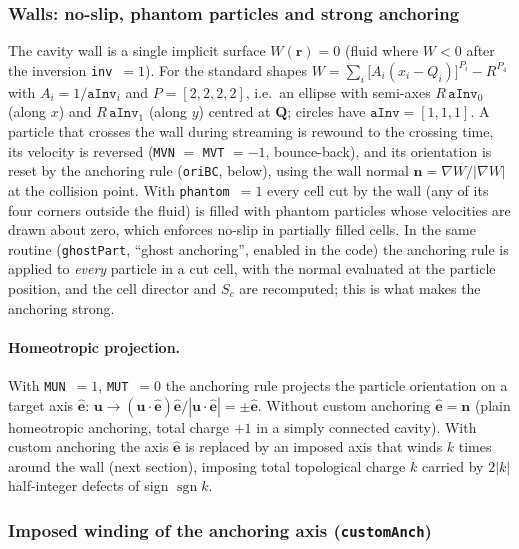 \subsubsection{Walls: no-slip, phantom particles and strong anchoring}
\label{sec:md-walls}

The cavity wall is a single implicit surface $W(\mathbf r)=0$ (fluid where $W<0$ after the
inversion \texttt{inv}~$=1$). For the standard shapes
$W=\sum_{i}\big[A_i(x_i-Q_i)\big]^{P_i}-R^{P_4}$ with $A_i=1/\texttt{aInv}_i$ and $P=[2,2,2,2]$,
i.e.\ an ellipse with semi-axes $R\,\texttt{aInv}_0$ (along $x$) and $R\,\texttt{aInv}_1$ (along $y$)
centred at $\mathbf Q$; circles have $\texttt{aInv}=[1,1,1]$.
A particle that crosses the wall during streaming is rewound to the crossing time, its velocity is
reversed (\texttt{MVN} $=$ \texttt{MVT} $=-1$, bounce-back), and its orientation is reset by
the anchoring rule (\texttt{oriBC}, below), using the wall normal $\mathbf n=\nabla W/|\nabla W|$ at the
collision point. With \texttt{phantom}~$=1$ every cell cut by the wall (any of its four corners outside
the fluid) is filled with phantom particles whose velocities are drawn about zero, which enforces
no-slip in partially filled cells. In the same routine (\texttt{ghostPart}, ``ghost anchoring'', enabled in
the code) the anchoring rule is applied to \emph{every} particle in a cut cell, with the normal
evaluated at the particle position, and the cell director and $S_c$ are recomputed; this
is what makes the anchoring strong.

\paragraph{Homeotropic projection.} With \texttt{MUN}~$=1$, \texttt{MUT}~$=0$ the anchoring rule
projects the particle orientation on a target axis $\hat{\mathbf e}$:
$\mathbf u\to(\mathbf u\cdot\hat{\mathbf e})\hat{\mathbf e}/|\mathbf u\cdot\hat{\mathbf e}|=\pm\hat{\mathbf e}$.
Without custom anchoring $\hat{\mathbf e}=\mathbf n$ (plain homeotropic anchoring, total charge $+1$ in a
simply connected cavity). With custom anchoring the axis $\hat{\mathbf e}$ is replaced by an imposed
axis that winds $k$ times around the wall (next section), imposing total topological charge $k$
carried by $2|k|$ half-integer defects of sign $\operatorname{sgn}k$.

\subsubsection{Imposed winding of the anchoring axis (\texttt{customAnch})}
\label{sec:md-anch}

